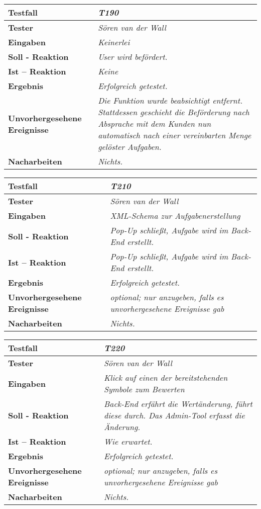 \begin{longtable}{|p{4cm}|p{11cm}|}
\hline
\textbf{Testfall} & \textit{\textbf{T190}} \\
\hline
\textbf{Tester} & \textit{Sören van der Wall} \\
\hline
\textbf{Eingaben} & \textit{Keinerlei} \\
\hline
\textbf{Soll - Reaktion} & \textit{User wird befördert.
} \\
\hline
\textbf{Ist -- Reaktion} & \textit{Keine} \\
\hline
\textbf{Ergebnis} & \textit{Erfolgreich getestet.} \\
\hline
\textbf{Unvorhergesehene Ereignisse} &
\textit{Die Funktion wurde beabsichtigt entfernt. Stattdessen geschieht die Beförderung nach Absprache mit dem Kunden nun automatisch nach einer vereinbarten Menge gelöster Aufgaben.} \\
\hline
\textbf{Nacharbeiten } & \textit{Nichts.} \\
\hline
\end{longtable}

\begin{longtable}{|p{4cm}|p{11cm}|}
\hline
\textbf{Testfall} & \textit{\textbf{T210}} \\
\hline
\textbf{Tester} & \textit{Sören van der Wall} \\
\hline
\textbf{Eingaben} & \textit{XML-Schema zur Aufgabenerstellung} \\
\hline
\textbf{Soll - Reaktion} & \textit{Pop-Up schließt, Aufgabe wird im Back-End erstellt.
} \\
\hline
\textbf{Ist -- Reaktion} & \textit{Pop-Up schließt, Aufgabe wird im Back-End erstellt.} \\
\hline
\textbf{Ergebnis} & \textit{Erfolgreich getestet.} \\
\hline
\textbf{Unvorhergesehene Ereignisse} &
\textit{optional; nur anzugeben, falls es unvorhergesehene Ereignisse gab} \\
\hline
\textbf{Nacharbeiten } & \textit{Nichts.} \\
\hline
\end{longtable}

\begin{longtable}{|p{4cm}|p{11cm}|}
\hline
\textbf{Testfall} & \textit{\textbf{T220}} \\
\hline
\textbf{Tester} & \textit{Sören van der Wall} \\
\hline
\textbf{Eingaben} & \textit{Klick auf einen der bereitstehenden Symbole zum Bewerten} \\
\hline
\textbf{Soll - Reaktion} & \textit{Back-End erfährt die Wertänderung, führt diese durch. Das Admin-Tool erfasst die Änderung.
} \\
\hline
\textbf{Ist -- Reaktion} & \textit{Wie erwartet.} \\
\hline
\textbf{Ergebnis} & \textit{Erfolgreich getestet.} \\
\hline
\textbf{Unvorhergesehene Ereignisse} &
\textit{optional; nur anzugeben, falls es unvorhergesehene Ereignisse gab} \\
\hline
\textbf{Nacharbeiten } & \textit{Nichts.} \\
\hline
\end{longtable}

